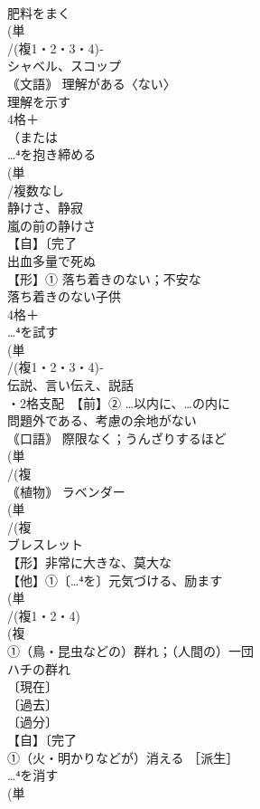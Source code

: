\documentclass[8pt]{extreport}
\begin{document}
\begin{CJK}{UTF8}{min}
\\	肥料をまく
\\	(単
\\	/(複1・2・3・4)‐
\\	シャベル、スコップ 
\\	｟文語｠ 理解がある〈ない〉　
\\	理解を示す
\\	4格＋
\\	（または
\\	…⁴を抱き締める
\\	(単
\\	/複数なし 
\\	静けさ、静寂 
\\	嵐の前の静けさ
\\	【自】〔完了
\\	出血多量で死ぬ 
\\	【形】① 落ち着きのない；不安な 
\\	落ち着きのない子供
\\	4格＋
\\	…⁴を試す
\\	(単
\\	/(複1・2・3・4)‐
\\	伝説、言い伝え、説話 
\\	・2格支配　【前】② …以内に、…の内に
\\	問題外である、考慮の余地がない
\\	｟口語｠ 際限なく；うんざりするほど
\\	(単
\\	/(複
\\	｟植物｠ ラベンダー
\\	(単
\\	/(複
\\	ブレスレット 
\\	【形】非常に大きな、莫大な 
\\	【他】①〔…⁴を〕元気づける、励ます 
\\	(単
\\	/(複1・2・4)
\\	(複
\\	①（鳥・昆虫などの）群れ；（人間の）一団 
\\	ハチの群れ
\\	〔現在〕
\\	〔過去〕
\\	〔過分〕
\\	【自】〔完了
\\	①（火・明かりなどが）消える ［派生］ 
\\	…⁴を消す
\\	(単

\end{CJK}
\end{document}
